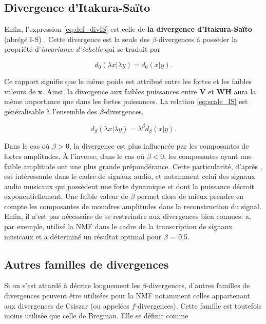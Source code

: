 \subsection{Divergence d'Itakura-Saïto}
Enfin, l'expression \ref{eq:def_divIS} est celle de \textbf{la divergence d'Itakura-Saïto} (abrégé I-S) \cite{itakura1968analysis, bertin_les_2009}. Cette divergence est la seule des $\beta$-divergences à posséder la propriété d'\textit{invariance d'échelle} qui se traduit par 

\begin{equation}\label{eq:scale_IS}
d_{0}(\lambda x \vert \lambda y) = d_{0}(x \vert y).
\end{equation}

Ce rapport signifie que le même poids est attribué entre les fortes et les faibles valeurs de $\mathbf{x}$. Ainsi, la divergence aux faibles puissances entre $\textbf{V}$ et $\textbf{WH}$ aura la même importance que dans les fortes puissances. La relation \ref{eq:scale_IS} est généralisable à l'ensemble des $\beta$-divergences,  

\begin{equation}
d_{\beta}(\lambda x \vert \lambda y) = \lambda^{\beta}d_{\beta}(x \vert y).
\end{equation}


Dans le cas où $\beta > 0$, la divergence est plus influencée par les composantes de fortes amplitudes. À l'inverse, dans le cas où $\beta < 0$, les composantes ayant une faible amplitude ont une plus grande prépondérance. Cette particularité, d'après \cite{fevotte_nonnegative_2009}, est intéressante dans le cadre de signaux audio, et notamment celui des signaux audio musicaux qui possèdent une forte dynamique et dont la puissance décroit exponentiellement. Une faible valeur de $\beta$ permet alors de mieux prendre en compte les composantes de moindres amplitudes dans la reconstruction du signal. Enfin, il n'est pas nécessaire de se restreindre aux divergences bien connues:  \cite{vincent2010adaptive} a, par exemple,  utilisé la NMF dans le cadre de la transcription de signaux musicaux et a déterminé un résultat optimal pour $\beta$ = 0,5. \\

\subsection{Autres familles de divergences}
Si on s'est attardé à décrire longuement les $\beta$-divergences, d'autres familles de divergences peuvent être utilisées pour la NMF notamment celles appartenant aux divergences de Csiszar (ou appelées $f$-divergences). Cette famille est toutefois moins utilisée que celle de Bregman. Elle se définit comme 

